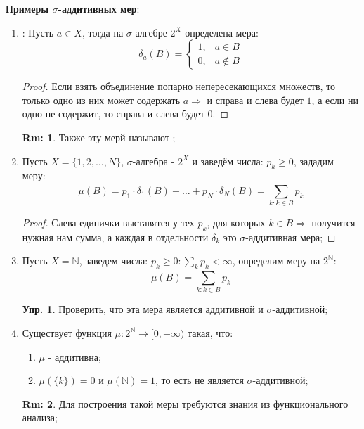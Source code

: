 \documentclass[12pt]{article}
\newcommand{\MN}{\mathbb{N}}
\theoremstyle{definition}
\newtheorem{rem}{Rm:}
\newtheorem{exrc}{Упр.}
\newcommand{\ddsum}[2]{\displaystyle\sum\limits_{#1}^{#2}}
\begin{document}
\textbf{Примеры $\sigma$-аддитивных мер}:
\begin{enumerate}[label=\arabic*)]
	\item {}: Пусть $a \in X$, тогда на $\sigma$-алгебре $2^X$ определена мера:
	$$
		\delta_a(B) = 
		\begin{cases}
			1, & a\in B\\
			0, & a \not\in B
		\end{cases}
	$$
	\begin{proof}
		Если взять объединение попарно непересекающихся множеств, то только одно из них может содержать $a \Rightarrow$ и справа и слева будет $1$, а если ни одно не содержит, то справа и слева будет $0$.
	\end{proof}
	\begin{rem}
		Также эту мерй называют ;
	\end{rem}
	\item Пусть $X = \{1,2,\dotsc, N\}$, $\sigma$-алгебра - $2^X$ и заведём числа: $p_k \geq 0$, зададим меру:
	$$
		\mu(B) = p_1{\cdot}\delta_1(B) + \dotsc + p_N{\cdot}\delta_N(B) = \ddsum{k \colon k \in B}{}p_k
	$$
	\begin{proof}
		Слева единички выставятся у тех $p_k$, для которых $k \in B \Rightarrow$ получится нужная нам сумма, а каждая в отдельности $\delta_k$ это $\sigma$-аддитивная мера;
	\end{proof} 
	\item Пусть $X = \MN$, заведем числа: $p_k \geq 0 \colon \sum_k p_k < \infty$, определим меру на $2^\MN$:
	$$
		\mu(B) = \ddsum{k \colon k \in B}{}p_k
	$$
	\begin{exrc}
		Проверить, что эта мера является аддитивной и $\sigma$-аддитивной;
	\end{exrc}
	\item Существует функция $\mu \colon 2^\MN \to [0,+\infty)$ такая, что:
	\begin{enumerate}[label=(\arabic*)]
		\item $\mu$ - аддитивна;
		\item $\mu(\{k\}) = 0$ и $\mu(\MN) = 1$, то есть не является $\sigma$-аддитивной;
	\end{enumerate}
	\begin{rem}
		Для построения такой меры требуются знания из функционального анализа;
	\end{rem}
\end{enumerate}
\end{document}

